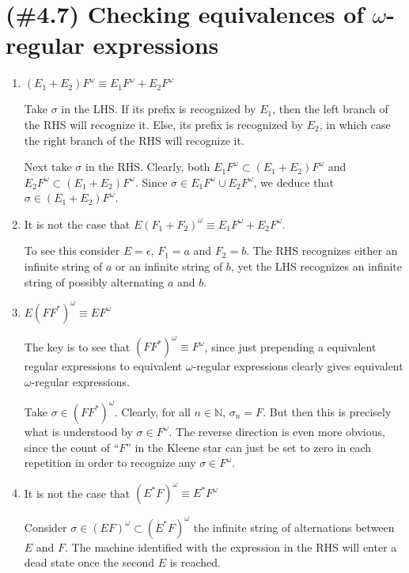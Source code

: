 \documentclass[letterpaper,11pt]{article}
\newcommand{\N}{\mathbb{N}}
\newcommand{\union}{\cup}
\newcommand{\enumalpha}{\renewcommand\labelenumi{(\alph{enumi})}}
\begin{document}
\section{(\#4.7) Checking equivalences of $\omega$-regular expressions}

\begin{enumerate}
        \enumalpha
    \item $(E_1 + E_2)F^\omega \equiv E_1 F^\omega + E_2 F^\omega$

        Take $\sigma$ in the LHS. If its prefix is recognized by $E_1$, then
        the left branch of the RHS will recognize it. Else, its prefix is
        recognized by $E_2$, in which case the right branch of the RHS will
        recognize it.

        Next take $\sigma$ in the RHS. Clearly, both
        $E_1 F^\omega \subset (E_1 + E_2) F^\omega$ and
        $E_2 F^\omega \subset (E_1 + E_2) F^\omega$.
        Since $\sigma \in E_1 F^\omega \union E_2 F^\omega$, we deduce that
        $\sigma \in (E_1 + E_2) F^\omega$.

    \item It is not the case that
        $E (F_1 + F_2)^\omega \equiv E_1 F^\omega + E_2 F^\omega$.

        To see this consider $E = \epsilon$, $F_1 = a$ and $F_2 = b$. The RHS
        recognizes either an infinite string of $a$ or an infinite string of
        $b$, yet the LHS recognizes an infinite string of possibly alternating
        $a$ and $b$.

    \item $E (F F^*)^\omega \equiv E F^\omega$

        The key is to see that $(F F^*)^\omega \equiv F^\omega$, since just
        prepending a equivalent regular expressions to equivalent
        $\omega$-regular expressions clearly gives equivalent $\omega$-regular
        expressions.

        Take $\sigma \in (F F^*)^\omega$. Clearly, for all $n \in \N$,
        $\sigma_n = F$. But then this is precisely what is understood by
        $\sigma \in F^\omega$. The reverse direction is even more obvious,
        since the count of ``$F$'' in the Kleene star can just be set to zero
        in each repetition in order to recognize any $\sigma \in F^\omega$.

    \item It is not the case that
        $(E^* F)^\omega \equiv E^* F^\omega$

        Consider $\sigma \in (E F)^\omega \subset (E^* F)^\omega$ the infinite
        string of alternations between $E$ and $F$. The machine identified with
        the expression in the RHS will enter a dead state once the second $E$
        is reached.
\end{enumerate}

\end{document}
